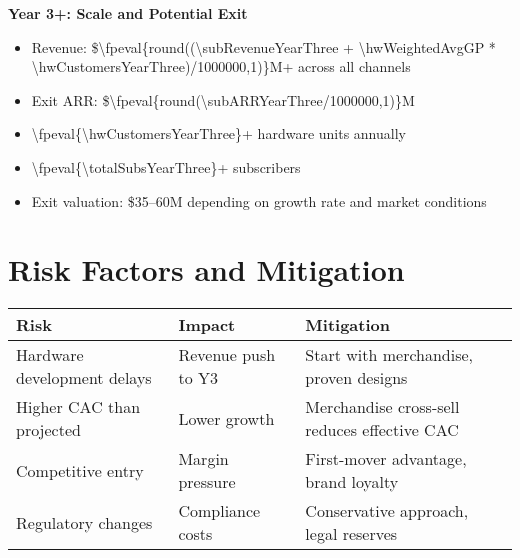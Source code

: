 \documentclass[11pt]{article}
\newcommand{\numfpeval}[1]{\num{\fpeval{#1}}}
\newcommand{\numint}[1]{\num[round-precision=0]{\fpeval{#1}}}
\begin{document}
\textbf{Year 3+: Scale and Potential Exit}
\begin{itemize}
  \item Revenue: \$\numfpeval{round((\subRevenueYearThree + \hwWeightedAvgGP * \hwCustomersYearThree)/1000000,1)}M+ across all channels
  \item Exit ARR: \$\numfpeval{round(\subARRYearThree/1000000,1)}M
  \item \numint{\hwCustomersYearThree}+ hardware units annually
  \item \numint{\totalSubsYearThree}+ subscribers
  \item Exit valuation: \$35--60M depending on growth rate and market conditions
\end{itemize}

\section{Risk Factors and Mitigation}

\begin{table}[H]
\centering
\begin{tabularx}{\linewidth}{l X X}
\toprule
Risk & Impact & Mitigation \\\midrule
Hardware development delays & Revenue push to Y3 & Start with merchandise, proven designs \\
Higher CAC than projected & Lower growth & Merchandise cross-sell reduces effective CAC \\
Competitive entry & Margin pressure & First-mover advantage, brand loyalty \\
Regulatory changes & Compliance costs & Conservative approach, legal reserves \\
\bottomrule
\end{tabularx}
\end{table}

\printbibliography
\end{document}
